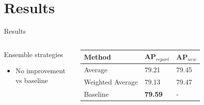 \section{Results}
\begin{frame}{Results}{}
\begin{columns}
    \begin{block}{Ensemble strategies}
    \begin{itemize}
        \item No improvement vs baseline
    \end{itemize}  
\end{block}  
    \begin{table}[]
    \centering
    \begin{tabular}{|l|l|l|}
    \hline
    \textbf{Method} & \textbf{AP$_{report}$} & \textbf{AP$_{new}$} \\ \hline
    Average          & 79.21     & 79.45  \\ \hline
    Weighted Average & 79.13     & 79.47  \\ \hline
    Baseline         & \textbf{79.59}     & -  \\ \hline
    \end{tabular}
    \end{table} 

\end{columns}
\end{frame}

